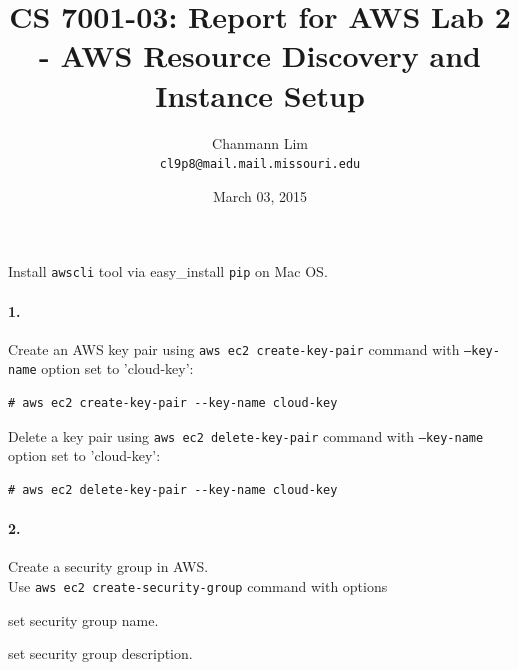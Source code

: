 \documentclass[a4paper]{article}
\begin{document}
\title{CS 7001-03: Report for AWS Lab 2 - AWS Resource Discovery and Instance Setup}
\author{Chanmann Lim\\ 
	\texttt{cl9p8@mail.mail.missouri.edu}}
\date{March 03, 2015}
\maketitle


Install \texttt{awscli} tool via easy\_install \texttt{pip} on Mac OS.

\paragraph{1. } Create an AWS key pair using \texttt{aws ec2 create-key-pair} command with \texttt{--key-name} option set to 'cloud-key':
\begin{verbatim}
# aws ec2 create-key-pair --key-name cloud-key
\end{verbatim}

Delete a key pair using \texttt{aws ec2 delete-key-pair} command with \texttt{--key-name} option set to 'cloud-key':
\begin{verbatim}
# aws ec2 delete-key-pair --key-name cloud-key
\end{verbatim}

\paragraph{2. } Create a security group in AWS. \\

Use \texttt{aws ec2 create-security-group} command with options
\begin{description}
\leftskip 0.4in
\parindent -0.4in
	\item[\texttt{--group-name} : ] set security group name.
	\item[\texttt{--description} : ] set security group description.
\end{description}
\end{document}
